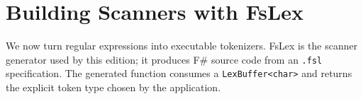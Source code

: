 \chapter{Building Scanners with FsLex \label{chapter:ply-lex}}
We now turn regular expressions into executable tokenizers.
FsLex is the scanner generator used by this edition; it produces F\# source code from an \texttt{.fsl} specification.
The generated function consumes a \texttt{LexBuffer<char>} and returns the explicit token type chosen by the application.

